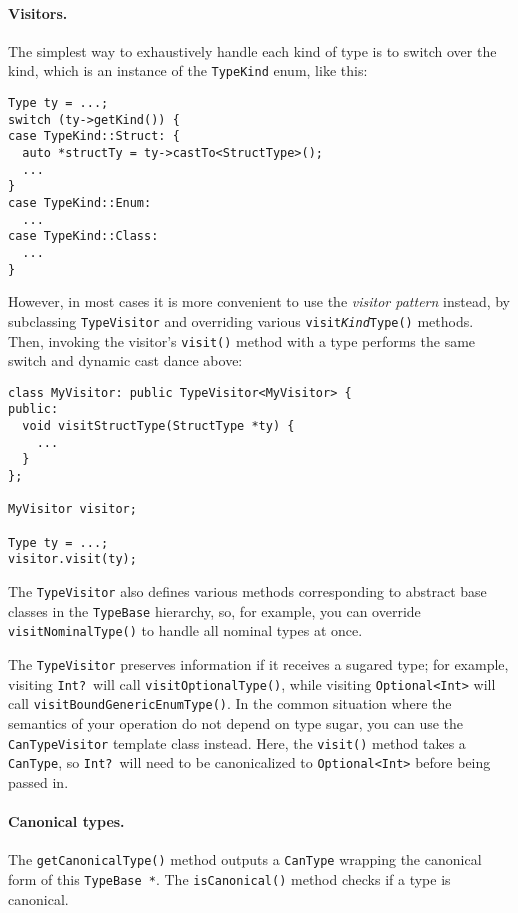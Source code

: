 \documentclass[../generics]{subfiles}
\begin{document}
\paragraph{Visitors.}
The simplest way to exhaustively handle each kind of type is to switch over the kind, which is an instance of the \texttt{TypeKind} enum, like this:
\begin{Verbatim}
Type ty = ...;
switch (ty->getKind()) {
case TypeKind::Struct: {
  auto *structTy = ty->castTo<StructType>();
  ...
}
case TypeKind::Enum:
  ...
case TypeKind::Class:
  ...
}
\end{Verbatim}
However, in most cases it is more convenient to use the \emph{visitor pattern} instead, by subclassing \texttt{TypeVisitor} and overriding various \texttt{visit\emph{Kind}Type()} methods. Then, invoking the visitor's \texttt{visit()} method with a type performs the same switch and dynamic cast dance above:
\begin{Verbatim}
class MyVisitor: public TypeVisitor<MyVisitor> {
public:
  void visitStructType(StructType *ty) {
    ...
  }
};

MyVisitor visitor;

Type ty = ...;
visitor.visit(ty);
\end{Verbatim}
The \texttt{TypeVisitor} also defines various methods corresponding to abstract base classes in the \texttt{TypeBase} hierarchy, so, for example, you can override \texttt{visitNominalType()} to handle all nominal types at once.

The \texttt{TypeVisitor} preserves information if it receives a sugared type; for example, visiting \texttt{Int?}\ will call \texttt{visitOptionalType()}, while visiting \texttt{Optional<Int>} will call \texttt{visitBoundGenericEnumType()}. In the common situation where the semantics of your operation do not depend on type sugar, you can use the \texttt{CanTypeVisitor} template class instead. Here, the \texttt{visit()} method takes a \texttt{CanType}, so \texttt{Int?}\ will need to be canonicalized to \texttt{Optional<Int>} before being passed in.

\paragraph{Canonical types.}
The \texttt{getCanonicalType()} method outputs a \texttt{CanType} wrapping the canonical form of this \texttt{TypeBase *}. The \texttt{isCanonical()} method checks if a type is canonical.
\end{document}
